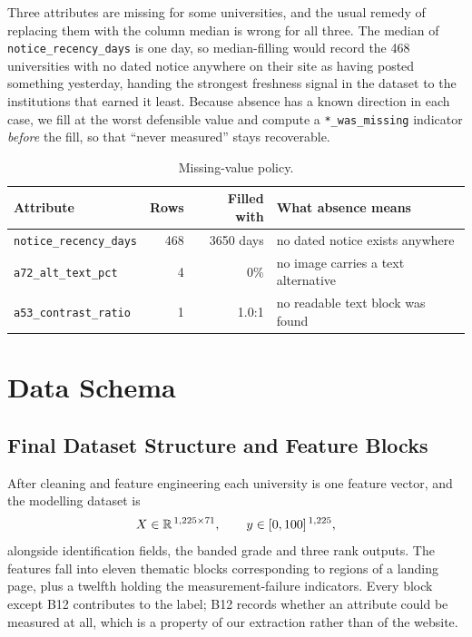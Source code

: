 \documentclass[11pt,a4paper]{article}
\begin{document}
Three attributes are missing for some universities, and the usual remedy of replacing them with the
column median is wrong for all three. The median of \texttt{notice\_recency\_days} is one day, so
median-filling would record the 468 universities with no dated notice anywhere on their site as
having posted something yesterday, handing the strongest freshness signal in the dataset to the
institutions that earned it least. Because absence has a known direction in each case, we fill at
the worst defensible value and compute a \texttt{*\_was\_missing} indicator \emph{before} the fill,
so that ``never measured'' stays recoverable.

\begin{table}[H]\centering\small
\caption{Missing-value policy.}
\begin{tabular}{lrrl}
\toprule
\textbf{Attribute} & \textbf{Rows} & \textbf{Filled with} & \textbf{What absence means} \\
\midrule
\texttt{notice\_recency\_days} & 468 & 3650 days & no dated notice exists anywhere \\
\texttt{a72\_alt\_text\_pct}   & 4   & 0\%       & no image carries a text alternative \\
\texttt{a53\_contrast\_ratio}  & 1   & 1.0:1     & no readable text block was found \\
\bottomrule
\end{tabular}
\end{table}

\section{Data Schema}
\label{sec:schema}

\subsection{Final Dataset Structure and Feature Blocks}
\label{sec:blocks}

After cleaning and feature engineering each university is one feature vector, and the modelling
dataset is
\begin{equation}
X \in \mathbb{R}^{\,1,225{} \times 71{}}, \qquad y \in [0,100]^{\,1,225{}},
\end{equation}
alongside identification fields, the banded grade and three rank outputs. The \nFeat{} features fall
into eleven thematic blocks corresponding to regions of a landing page, plus a twelfth holding the
measurement-failure indicators. Every block except B12 contributes to the label; B12 records whether
an attribute could be measured at all, which is a property of our extraction rather than of the
website.
\end{document}
